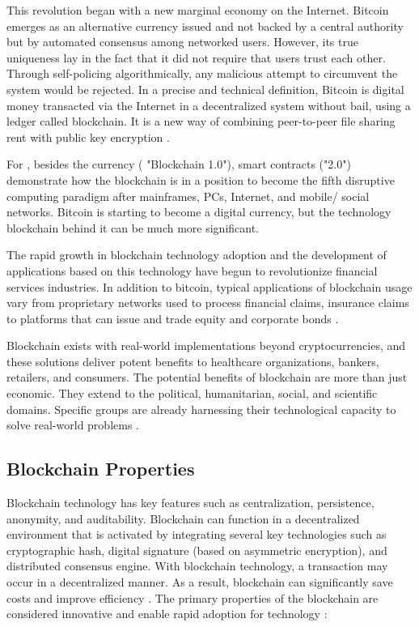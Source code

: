 This revolution began with a new marginal economy on the Internet. Bitcoin emerges as an alternative currency issued and not backed by a central authority but by automated consensus among networked users. However, its true uniqueness lay in the fact that it did not require that users trust each other. Through self-policing algorithmically, any malicious attempt to circumvent the system would be rejected. In a precise and technical definition, Bitcoin is digital money transacted via the Internet in a decentralized system without bail, using a ledger called blockchain. It is a new way of combining peer-to-peer file sharing rent with public key encryption \cite{swan2015blockchain}.

For \cite{swan2015blockchain}, besides the currency ( "Blockchain 1.0"), smart contracts ("2.0") demonstrate how the blockchain is in a position to become the fifth disruptive computing paradigm after mainframes, PCs, Internet, and mobile/ social networks. Bitcoin is starting to become a digital currency, but the technology blockchain behind it can be much more significant.

The rapid growth in blockchain technology adoption and the development of applications based on this technology have begun to revolutionize financial services industries. In addition to bitcoin, typical applications of blockchain usage vary from proprietary networks used to process financial claims, insurance claims to platforms that can issue and trade equity and corporate bonds \cite{michael2018blockchain}.

Blockchain exists with real-world implementations beyond cryptocurrencies, and these solutions deliver potent benefits to healthcare organizations, bankers, retailers, and consumers. The potential benefits of blockchain are more than just economic. They extend to the political, humanitarian, social, and scientific domains. Specific groups are already harnessing their technological capacity to solve real-world problems \cite{michael2018blockchain}.



\subsection{Blockchain Properties}\label{sec:propriedades}

Blockchain technology has key features such as centralization, persistence, anonymity, and auditability. Blockchain can function in a decentralized environment that is activated by integrating several key technologies such as cryptographic hash, digital signature (based on asymmetric encryption), and distributed consensus engine. With blockchain technology, a transaction may occur in a decentralized manner. As a result, blockchain can significantly save costs and improve efficiency \cite{zheng2016blockchain}. The primary properties of the blockchain are considered innovative and enable rapid adoption for technology \cite{greve2018blockchain}:

